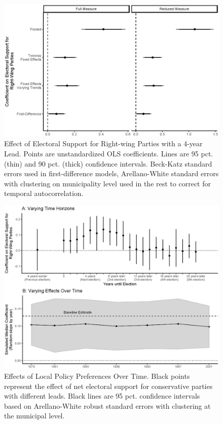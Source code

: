 \documentclass[a4paper,12pt]{article}
\begin{document}
\begin{figure}[htbp]
	\centering
	\includegraphics[scale = 0.8]{CoefPlot_18092018.eps}
	\caption{Effect of Electoral Support for Right-wing Parties with a 4-year Lead. Points are unstandardized OLS coefficients. Lines are 95 pct. (thin) and 90 pct. (thick) confidence intervals. Beck-Katz standard errors used in first-difference models, Arellano-White standard errors with clustering on municipality level used in the rest to correct for temporal autocorrelation.}
	\label{fig:FourYearLead}
\end{figure}





 

\begin{figure}[h]
	\centering
	\includegraphics[scale = .6]{EffectsVsTime.eps}
	\caption{Effects of Local Policy Preferences Over Time. Black points represent the effect of net electoral support for conservative parties with different leads. Black lines are 95 pct. confidence intervals based on Arellano-White robust standard errors with clustering at the municipal level.}
	\label{fig:LongRun}
\end{figure}
\end{document}
